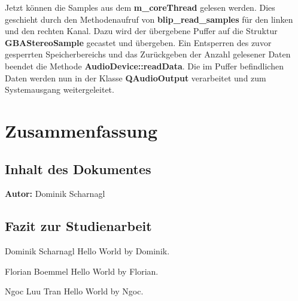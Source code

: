 \documentclass[11pt,a4paper]{scrartcl}
\newcommand{\AutorDominik} {
    \vspace{-4mm}
    \large \textbf{Autor:} Dominik Scharnagl \normalsize
    \vspace{2mm}
}
\begin{document}
Jetzt k\"onnen die Samples aus dem \textbf{m\_coreThread} gelesen werden. Dies geschieht durch den Methodenaufruf von \textbf{blip\_read\_samples} f\"ur den linken und den rechten Kanal. 
Dazu wird der \"ubergebene Puffer auf die Struktur \textbf{GBAStereoSample} gecastet und \"ubergeben. Ein Entsperren des zuvor gesperrten Speicherbereichs und das Zur\"uckgeben der Anzahl gelesener Daten beendet die Methode
\textbf{AudioDevice::readData}. Die im Puffer befindlichen Daten werden nun in der Klasse \textbf{QAudioOutput} verarbeitet und zum Systemausgang weitergeleitet.


\newpage


\section{Zusammenfassung} \label{Zusammenfassung}


\subsection{Inhalt des Dokumentes}
\AutorDominik

\subsection{Fazit zur Studienarbeit}

\large Dominik Scharnagl
\vspace{2mm}\newline
Hello World by Dominik.

\vspace{5mm}
\large Florian Boemmel
\vspace{2mm}\newline
Hello World by Florian.

\vspace{5mm}
\large Ngoc Luu Tran
\vspace{2mm}\newline
Hello World by Ngoc.


\newpage
{}
\end{document}
